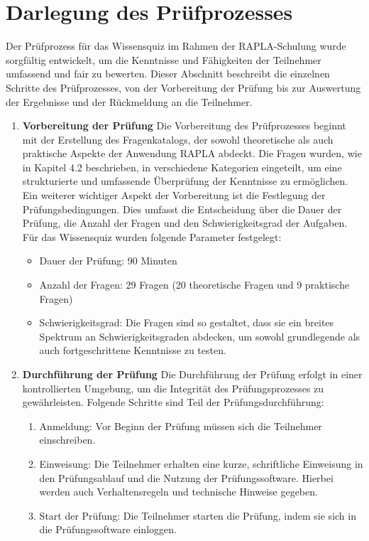 \section{Darlegung des Prüfprozesses}
Der Prüfprozess für das Wissensquiz im Rahmen der RAPLA-Schulung wurde sorgfältig entwickelt, um die Kenntnisse und Fähigkeiten der Teilnehmer umfassend und fair zu bewerten. Dieser Abschnitt beschreibt die einzelnen Schritte des Prüfprozesses, von der Vorbereitung der Prüfung bis zur Auswertung der Ergebnisse und der Rückmeldung an die Teilnehmer.
\begin{enumerate}
    \item \textbf{Vorbereitung der Prüfung}
Die Vorbereitung des Prüfprozesses beginnt mit der Erstellung des Fragenkatalogs, der sowohl theoretische als auch praktische Aspekte der Anwendung RAPLA abdeckt. Die Fragen wurden, wie in Kapitel 4.2 beschrieben, in verschiedene Kategorien eingeteilt, um eine strukturierte und umfassende Überprüfung der Kenntnisse zu ermöglichen.
Ein weiterer wichtiger Aspekt der Vorbereitung ist die Festlegung der Prüfungsbedingungen. Dies umfasst die Entscheidung über die Dauer der Prüfung, die Anzahl der Fragen und den Schwierigkeitsgrad der Aufgaben. Für das Wissensquiz wurden folgende Parameter festgelegt:
    \begin{itemize}
        \item Dauer der Prüfung: 90 Minuten
        \item Anzahl der Fragen: 29 Fragen (20 theoretische Fragen und 9 praktische Fragen)
        \item Schwierigkeitsgrad: Die Fragen sind so gestaltet, dass sie ein breites Spektrum an Schwierigkeitsgraden abdecken, um sowohl grundlegende als auch fortgeschrittene Kenntnisse zu testen.
    \end{itemize}
    \item \textbf{Durchführung der Prüfung}
Die Durchführung der Prüfung erfolgt in einer kontrollierten Umgebung, um die Integrität des Prüfungsprozesses zu gewährleisten. Folgende Schritte sind Teil der Prüfungsdurchführung:
    \begin{enumerate}
        \item Anmeldung: Vor Beginn der Prüfung müssen sich die Teilnehmer einschreiben.
        \item Einweisung: Die Teilnehmer erhalten eine kurze, schriftliche Einweisung in den Prüfungsablauf und die Nutzung der Prüfungssoftware. Hierbei werden auch Verhaltensregeln und technische Hinweise gegeben.
        \item Start der Prüfung: Die Teilnehmer starten die Prüfung, indem sie sich in die Prüfungssoftware einloggen. 

\end{enumerate}
\end{enumerate}
